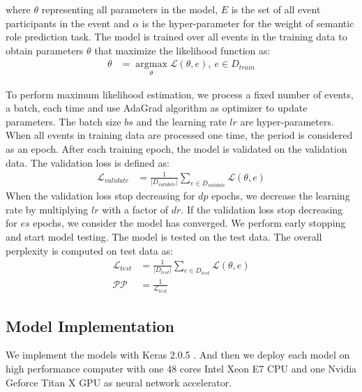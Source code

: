 \documentclass[a4paper]{article}
\begin{document}
where $\theta$ representing all parameters in the model, $E$ is the set of all event participants in the event and $\alpha$ is the hyper-parameter for the weight of semantic role prediction task. The model is trained over all events in the training data to obtain parameters $\theta$ that maximize the likelihood function as:
\begin{equation} \label{eq:mle}
\begin{aligned}
    \theta
        &= \mathop{argmax} \limits_{\theta} \mathcal{L}(\theta, e),\ e \in D_{train}
\end{aligned}
\end{equation}

To perform maximum likelihood estimation, we process a fixed number of events, a batch, each time and use AdaGrad algorithm \citep{duchi2011adaptive} as optimizer to update parameters. The batch size $bs$ and the learning rate $lr$ are hyper-parameters. When all events in training data are processed one time, the period is considered as an epoch. After each training epoch, the model is validated on the validation data. The validation loss is defined as: 
\begin{equation} \label{eq:validation}
\begin{aligned}
    \mathcal{L}_{validate}
        &= \frac{1}{|D_{validate}|} \sum_{e \in D_{validate}} \mathcal{L}(\theta, e) 
\end{aligned}
\end{equation}
When the validation loss stop decreasing for $dp$ epochs, we decrease the learning rate by multiplying $lr$ with a factor of $dr$. If the validation loss stop decreasing for $es$ epochs, we consider the model has converged. We perform early stopping and start model testing. The model is tested on the test data. The overall perplexity is computed on test data as:
\begin{equation} \label{eq:perplexity}
\begin{aligned}
    \mathcal{L}_{test}
        &= \frac{1}{|D_{test}|} \sum_{e \in D_{test}} \mathcal{L}(\theta, e) \\
    \mathcal{PP}
        &= \frac{1}{\mathcal{L}_{test}}
\end{aligned}
\end{equation}


\subsection{Model Implementation} \label{sec:implementation}
We implement the models with Keras 2.0.5 \citep{chollet2015keras}. And then we deploy each model on high performance computer with one 48 cores Intel Xeon E7 CPU and one Nvidia Geforce Titan X GPU as neural network accelerator. 
\end{document}
